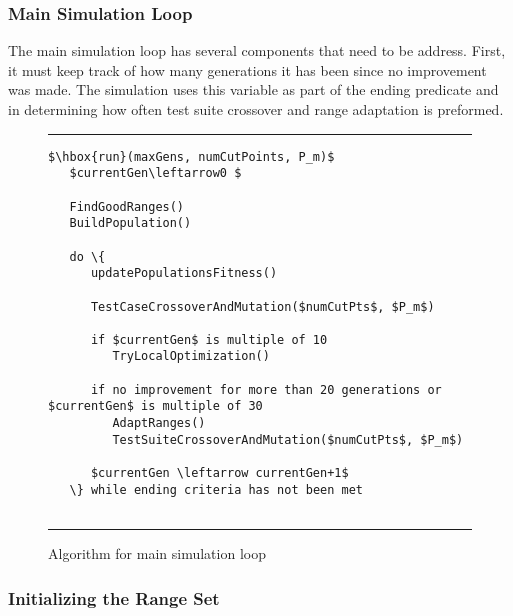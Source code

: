 \documentclass[runningheads]{llncs}
\begin{document}
\subsubsection{Main Simulation Loop}
The main simulation loop has several components that need to be address. First, it must keep track of how many generations it has been since no improvement was made. The simulation uses this variable as part of the ending predicate and in determining how often test suite crossover and range adaptation is preformed.

\begin{figure}[h!]
\begin{center}
\hrule
\medskip
\begin{Verbatim}[fontfamily=tt, xleftmargin=10pt, commandchars=\\\{\},
codes={\catcode`$=3\catcode`^=7\catcode`_=8}]
$\hbox{run}(maxGens, numCutPoints, P_m)$
   $currentGen\leftarrow0 $

   FindGoodRanges()
   BuildPopulation()

   do \{
      updatePopulationsFitness()

      TestCaseCrossoverAndMutation($numCutPts$, $P_m$)

      if $currentGen$ is multiple of 10
         TryLocalOptimization()

      if no improvement for more than 20 generations or $currentGen$ is multiple of 30 
         AdaptRanges() 
         TestSuiteCrossoverAndMutation($numCutPts$, $P_m$) 

      $currentGen \leftarrow currentGen+1$
   \} while ending criteria has not been met
	
\end{Verbatim}
\hrule
\end{center}
\caption{Algorithm for main simulation loop \label{fig:simLoopAlt}}
\end{figure}


\subsubsection{Initializing the Range Set}
\end{document}
